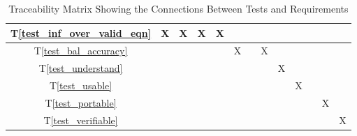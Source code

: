 \documentclass[12pt, titlepage]{article}
\newcommand{\testref}[1]{T\ref{#1}}
\begin{document}
\begin{landscape}
\begin{table}[h!]
\begin{tabular}{|c|c|c|c|c|c|c|c|c|c|c|c|c|}
      \testref{test_inf_over_valid_eqn}      & X              & X                & X                 & X                     &                  &                     &                       &                                &                        &                              &                          &                            \\ \hline
      \testref{test_bal_accuracy}            &                &                  &                   &                       & X                &                     & X                     &                                &                        &                              &                          &                            \\ \hline
      \testref{test_understand}              &                &                  &                   &                       &                  &                     &                       & X                              &                        &                              &                          &                            \\ \hline
      \testref{test_usable}                  &                &                  &                   &                       &                  &                     &                       &                                & X                      &                              &                          &                            \\ \hline
      \testref{test_portable}                &                &                  &                   &                       &                  &                     &                       &                                &                        &                              & X                        &                            \\ \hline
      \testref{test_verifiable}              &                &                  &                   &                       &                  &                     &                       &                                &                        &                              &                          & X                          \\ \hline
    \end{tabular}
    \caption{Traceability Matrix Showing the Connections Between Tests and Requirements}
    \label{Table:trace}
  \end{table}

\end{landscape}
\end{document}
